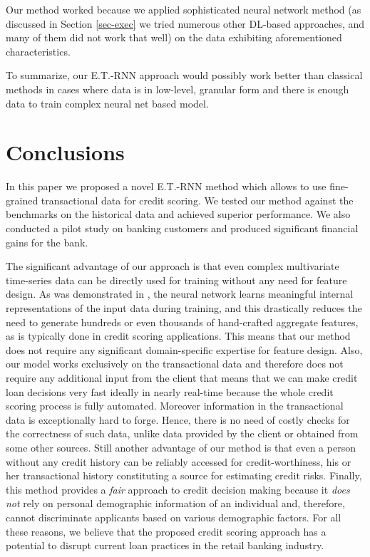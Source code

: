 \documentclass[sigconf]{acmart}
\begin{document}
Our method worked because we applied sophisticated neural network method (as discussed in Section \ref{sec-exec} we tried numerous other DL-based approaches, and many of them did not work that well) on the data exhibiting aforementioned characteristics.

To summarize, our E.T.-RNN approach would possibly work better than classical methods in cases where data is in low-level, granular form and there is enough data to train complex neural net based model.

\section{Conclusions}

In this paper we proposed a novel E.T.-RNN method which allows to use fine-grained transactional data for credit scoring.
We tested our method against the benchmarks on the historical data and achieved superior performance. We also conducted a pilot study on banking customers and produced significant financial gains for the bank.

The significant advantage of our approach is that even complex multivariate time-series data can be directly used for training without any need for feature design. As was demonstrated in \cite{erhan2009visualizing}, the neural network learns meaningful internal representations of the input data during training, and this drastically reduces the need to generate hundreds or even thousands of hand-crafted aggregate features, as is typically done in credit scoring applications. This means that our method does not require any significant domain-specific expertise for feature design.
Also, our model works exclusively on the transactional data and therefore does not require any additional input from the client that means that we can make credit loan decisions very fast ideally in nearly real-time because the whole credit scoring process is fully automated.
Moreover information in the transactional data is exceptionally hard to forge. Hence, there is no need of costly checks for the correctness of such data, unlike data provided by the client or obtained from some other sources.
Still another advantage of our method is that even a person without any credit history can be reliably accessed for credit-worthiness, his or her transactional history constituting a source for estimating credit risks.
Finally, this method provides a \textit{fair} approach to credit decision making because it \textit{does not} rely on personal demographic information of an individual and, therefore, cannot discriminate applicants based on various demographic factors.
For all these reasons, we believe that the proposed credit scoring approach has a potential to disrupt current loan practices in the retail banking industry.
\end{document}
